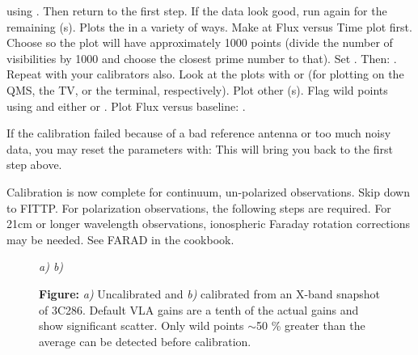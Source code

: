 using . Then return to the first  step.
If the data look good, run  again for the remaining
\IF(s). 
 Plots the \uvdata in a variety of ways.  Make at Flux
versus Time plot first. Choose  so the plot will have
approximately 1000 points (divide the number of visibilities by 1000 and
choose the closest prime number to that).
Set . Then:
.~
Repeat  with your calibrators also.
Look at the plots with  or  (for plotting
on the QMS, the TV, or the terminal, respectively).
Plot other \IF(s). Flag wild points using  and either
 or . Plot Flux versus baseline:
.

If the calibration failed because of a bad reference antenna or too much
noisy data, you may reset the parameters with: 
This will bring you back to the first  step above.

\eeddes
Calibration is now complete for continuum, un-polarized observations.
Skip down to FITTP.
For polarization observations, the following steps are required.
For 21cm or longer wavelength observations, ionospheric Faraday
rotation corrections may be needed.  See FARAD in the \AIPS cookbook.

\begin{figure}[h]
\vskip 4in
{\it \hskip 1.5in a) \hfill b) \hskip 1.5in}

{\bf Figure:}
{\it a)} Uncalibrated \uvdata and  {\it b)}
calibrated \uvdata from an X-band snapshot of 3C286.
Default VLA gains are a tenth of the actual gains and
show significant scatter.
Only wild \uvdata points $\sim$50 \% greater than the average
can be detected before calibration.
\end{figure}

